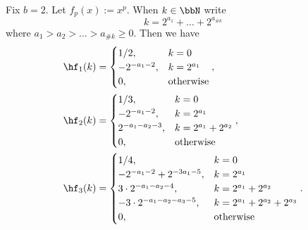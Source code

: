 \documentclass[acmsmall]{acmart}
\begin{document}
\begin{lemma}\label{lemma:walsh_low_order_monomials}
    Fix $b=2$. Let $f_p(x) := x^p$. When $k \in \bbN$ write 
    $$k = 2^{a_1}+\dots+2^{a_{\#k}}$$
    where $a_1 > a_2 > \dots > a_{\#k} \geq 0$. Then we have 
    \begin{align*}
        \hf_1(k) &= \begin{cases} 1/2, & k = 0 \\ -2^{-a_1-2}, & k=2^{a_1} \\ 0, & \mathrm{otherwise} \end{cases}, \\
        \hf_2(k) &= \begin{cases} 1/3, & k = 0 \\ -2^{-a_1-2}, & k=2^{a_1} \\ 2^{-a_1-a_2-3}, & k = 2^{a_1}+2^{a_2} \\ 0, & \mathrm{otherwise} \end{cases}, \\
        \hf_3(k) &= \begin{cases} 1/4, & k=0 \\ -2^{-a_1-2} + 2^{-3a_1-5}, & k = 2^{a_1} \\ 3 \cdot 2^{-a_1-a_2-4}, & k=2^{a_1}+2^{a_2} \\ -3 \cdot 2^{-a_1-a_2-a_3-5}, & k=2^{a_1}+2^{a_2}+2^{a_3} \\ 0, & \mathrm{otherwise} \end{cases}.
    \end{align*}
\end{lemma}
\end{document}
